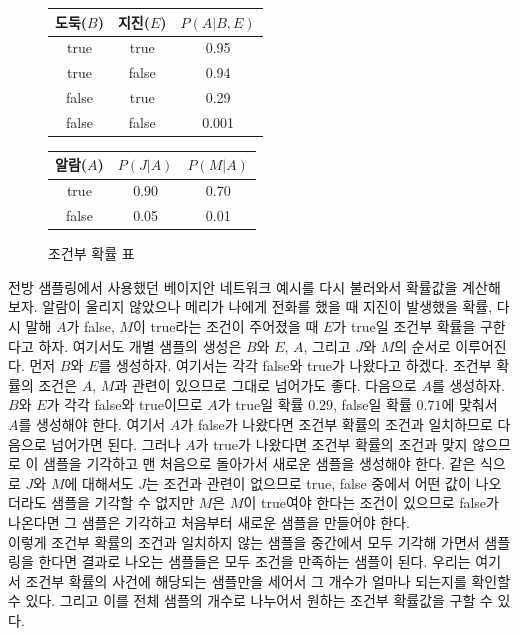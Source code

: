 \documentclass[a4paper]{oblivoir}
\begin{document}
\begin{figure}[ht] \centering 
\parbox[t]{3cm}
{
\begin{tabular}{|c|c|c|}
  \hline
  도둑($B$) & 지진($E$) & $P(A|B,E)$ \\
  \hline
  true & true & 0.95 \\
  \hline
  true & false & 0.94 \\
  \hline
  false & true & 0.29 \\
  \hline
  false & false & 0.001 \\
  \hline
\end{tabular}
} \hspace{3cm}
\parbox[t]{5cm}
{
\begin{tabular}{|c|c|c|}
  \hline
  알람($A$) & $P(J|A)$ & $P(M|A)$ \\
  \hline
  true & 0.90 & 0.70 \\
  \hline
  false & 0.05 & 0.01 \\
  \hline
\end{tabular}
}
\caption{조건부 확률 표}
\label{fig:10-1-1-2}
\end{figure} 

전방 샘플링에서 사용했던 베이지안 네트워크 예시를 다시 불러와서 확률값을 계산해보자. 알람이 울리지 않았으나 메리가 나에게 전화를 했을 때 지진이 발생했을 확률, 다시 말해 $A$가 false, $M$이 true라는 조건이 주어졌을 때 $E$가 true일 조건부 확률을 구한다고 하자. 여기서도 개별 샘플의 생성은 $B$와 $E$, $A$, 그리고 $J$와 $M$의 순서로 이루어진다. 먼저 $B$와 $E$를 생성하자. 여기서는 각각 false와 true가 나왔다고 하겠다. 조건부 확률의 조건은 $A$, $M$과 관련이 있으므로 그대로 넘어가도 좋다. 다음으로 $A$를 생성하자. $B$와 $E$가 각각 false와 true이므로 $A$가 true일 확률 $0.29$, false일 확률 $0.71$에 맞춰서 $A$를 생성해야 한다. 여기서 $A$가 false가 나왔다면 조건부 확률의 조건과 일치하므로 다음으로 넘어가면 된다. 그러나 $A$가 true가 나왔다면 조건부 확률의 조건과 맞지 않으므로 이 샘플을 기각하고 맨 처음으로 돌아가서 새로운 샘플을 생성해야 한다. 같은 식으로 $J$와 $M$에 대해서도 $J$는 조건과 관련이 없으므로 true, false 중에서 어떤 값이 나오더라도 샘플을 기각할 수 없지만 $M$은 $M$이 true여야 한다는 조건이 있으므로 false가 나온다면 그 샘플은 기각하고 처음부터 새로운 샘플을 만들어야 한다. \\

이렇게 조건부 확률의 조건과 일치하지 않는 샘플을 중간에서 모두 기각해 가면서 샘플링을 한다면 결과로 나오는 샘플들은 모두 조건을 만족하는 샘플이 된다. 우리는 여기서 조건부 확률의 사건에 해당되는 샘플만을 세어서 그 개수가 얼마나 되는지를 확인할 수 있다. 그리고 이를 전체 샘플의 개수로 나누어서 원하는 조건부 확률값을 구할 수 있다. \\
\end{document}
